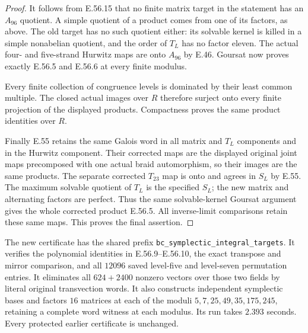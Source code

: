 \begin{proof}
It follows from E.56.15 that no finite matrix
target in the statement has an $A_{96}$
quotient. A simple quotient of a product
comes from one of its factors, as above.
The old target has no such quotient either:
its solvable kernel is killed in a simple
nonabelian quotient, and the order of $T_L$
has no factor eleven. The actual four- and
five-strand Hurwitz maps are onto $A_{96}$
by E.46. Goursat now proves exactly
E.56.5 and E.56.6 at every finite modulus.

Every finite collection of congruence levels
is dominated by their least common multiple.
The closed actual images over $R$ therefore
surject onto every finite projection of the
displayed products. Compactness proves the
same product identities over $R$.

Finally E.55 retains the same Galois word in
all matrix and $T_L$ components and in the
Hurwitz component. Their corrected maps
are the displayed original joint maps
precomposed with one actual braid
automorphism, so their images are the same
products. The separate corrected $T_{23}$
map is onto and agrees in $S_L$ by E.55.
The maximum solvable quotient of $T_L$ is
the specified $S_L$; the new matrix and
alternating factors are perfect. Thus the
same solvable-kernel Goursat argument gives
the whole corrected product E.56.5.
All inverse-limit comparisons retain these
same maps. This proves the final assertion.
\end{proof}

The new certificate has the shared prefix
\texttt{bc\_symplectic\_integral\_targets}.
It verifies the polynomial identities in
E.56.9--E.56.10, the exact transpose and
mirror comparison, and all $12096$ saved
level-five and level-seven permutation entries.
It eliminates all $624+2400$ nonzero vectors
over those two fields by literal original
transvection words. It also constructs
independent symplectic bases and factors
$16$ matrices at each of the moduli
$5,7,25,49,35,175,245$, retaining a complete
word witness at each modulus. Its run takes
$2.393$ seconds. Every protected earlier
certificate is unchanged.
